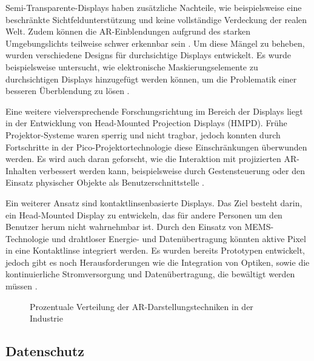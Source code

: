 Semi-Transparente-Displays haben zusätzliche Nachteile, wie beispielsweise eine
beschränkte Sichtfeldunterstützung und keine vollständige Verdeckung der realen
Welt. Zudem können die AR-Einblendungen aufgrund des starken Umgebungslichts
teilweise schwer erkennbar sein \cite{itoh2021towards}. Um diese Mängel zu
beheben, wurden verschiedene Designs für durchsichtige Displays entwickelt. Es
wurde beispielsweise untersucht, wie elektronische Maskierungselemente zu
durchsichtigen Displays hinzugefügt werden können, um die Problematik einer
besseren Überblendung zu lösen \cite{8676153}.

Eine weitere vielversprechende Forschungsrichtung im Bereich der Displays liegt
in der Entwicklung von Head-Mounted Projection Displays (HMPD). Frühe
Projektor-Systeme waren sperrig und nicht tragbar, jedoch konnten durch
Fortschritte in der Pico-Projektortechnologie diese Einschränkungen überwunden
werden. Es wird auch daran geforscht, wie die Interaktion mit projizierten
AR-Inhalten verbessert werden kann, beispielsweise durch Gestensteuerung oder
den Einsatz physischer Objekte als Benutzerschnittstelle
\cite{hartmann2020aar}.

Ein weiterer Ansatz sind kontaktlinsenbasierte Displays. Das Ziel besteht
darin, ein Head-Mounted Display zu entwickeln, das für andere Personen um den
Benutzer herum nicht wahrnehmbar ist. Durch den Einsatz von MEMS-Technologie
und drahtloser Energie- und Datenübertragung könnten aktive Pixel in eine
Kontaktlinse integriert werden. Es wurden bereits Prototypen entwickelt, jedoch
gibt es noch Herausforderungen wie die Integration von Optiken, sowie die
kontinuierliche Stromversorgung und Datenübertragung, die bewältigt werden
müssen \cite{chen2019design}.

\begin{figure}[h]
    \centering
    
    \caption[width=0.9\columnwidth]{Prozentuale Verteilung der AR-Darstellungstechniken in der Industrie \cite{de2020survey} }
    \label{fig:PercDistributionARDisplay}
\end{figure}

\subsection{Datenschutz}

